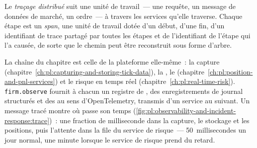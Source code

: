 \begin{definition}\label{def:pl:observability-and-incident-response:trace}
Le \emph{traçage distribué} suit une unité de travail~--- une requête, un message de données de marché, un ordre~--- à travers
les services qu'elle traverse. Chaque étape est un \emph{span}, une unité de travail dotée d'un début, d'une fin, d'un identifiant de trace partagé par toutes les
étapes et de l'identifiant de l'étape qui l'a causée, de sorte que le chemin peut être reconstruit sous forme d'arbre.
\end{definition}

La chaîne du chapitre est celle de la plateforme elle-même~: la capture (chapitre~\ref{ch:pl:capturing-and-storing-tick-data}), la , le 
(chapitre~\ref{ch:pl:position-and-pnl-services}) et le risque en temps réel (chapitre~\ref{ch:pl:real-time-risk}). \texttt{firm.observe} fournit
à chacun un registre de , des enregistrements de journal structurés et des  au sens d'OpenTelemetry, transmis d'un service au suivant. Un message tracé
montre où passe son temps (\cref{fig:pl:observability-and-incident-response:trace})~: une fraction de milliseconde dans la capture, le stockage et
les positions, puis l'attente dans la file du service de risque~--- 50~millisecondes un jour normal, une minute lorsque le service de risque prend du retard.

\label{lst:pl:observability-and-incident-response:tracer}

